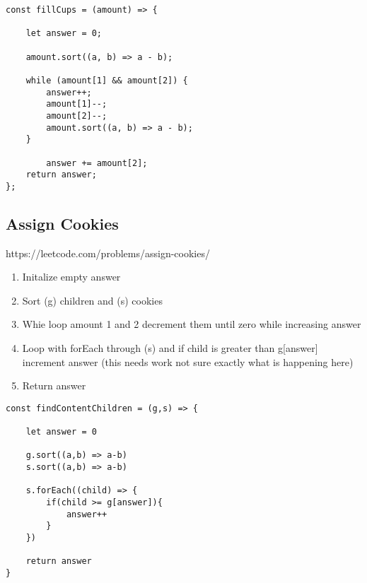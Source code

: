 \documentclass[10pt]{article}
\begin{document}
\begin{lstlisting}[title=Solution fillCups, captionpos=t]
const fillCups = (amount) => {
    
    let answer = 0;

    amount.sort((a, b) => a - b);
    
    while (amount[1] && amount[2]) {
        answer++;
        amount[1]--;
        amount[2]--;
        amount.sort((a, b) => a - b);
    }
    
        answer += amount[2];
    return answer;
};
\end{lstlisting}
\medskip %









\pagebreak %
\medskip 
\subsection{Assign Cookies}
https://leetcode.com/problems/assign-cookies/

\begin{enumerate}
	\item Initalize empty answer
	\item Sort (g) children and (s) cookies 
	\item Whie loop amount 1 and 2 decrement them until zero while increasing answer
	\item Loop with forEach through (s) and if  child is greater than g[answer]  increment answer (this needs work not sure exactly what is happening here)
	\item Return answer
\end{enumerate}



\begin{lstlisting}[title=Solution findContentChildren, captionpos=t]
const findContentChildren = (g,s) => {
    
    let answer = 0
    
    g.sort((a,b) => a-b)
    s.sort((a,b) => a-b)
    
    s.forEach((child) => {
        if(child >= g[answer]){
            answer++
        }
    })
    
    return answer
}
\end{lstlisting}
\medskip %
\end{document}
